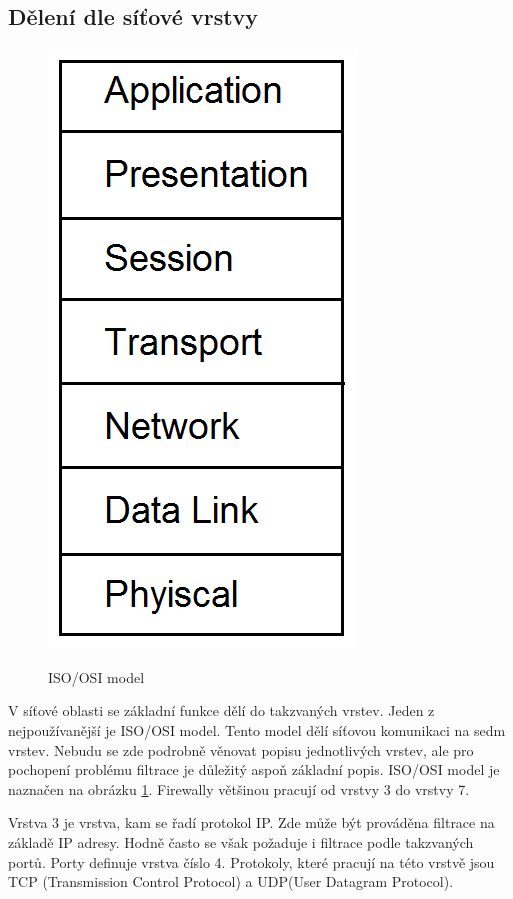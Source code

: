 \documentclass[11pt,twoside,a4paper]{article}
\begin{document}
\subsection{Dělení dle síťové vrstvy}

\begin{figure}
	\center
	\includegraphics[scale=0.25]{./pict/osi.png}
	\label{pic:osi_model}
	\caption{ISO/OSI model \cite{ref:osi}}
\end{figure}

V síťové oblasti se základní funkce dělí do takzvaných vrstev. Jeden z nejpoužívanější je ISO/OSI model. Tento model dělí síťovou komunikaci na sedm vrstev. Nebudu se zde podrobně věnovat popisu jednotlivých vrstev, ale pro pochopení problému filtrace je důležitý aspoň základní popis. ISO/OSI model je naznačen na obrázku \ref{pic:osi_model}. Firewally většinou pracují od vrstvy 3 do vrstvy 7. 


Vrstva 3 je vrstva, kam se řadí protokol IP. Zde může být prováděna filtrace na základě IP adresy. Hodně často se však požaduje i filtrace podle takzvaných portů. Porty definuje vrstva číslo 4. Protokoly, které pracují na této vrstvě jsou TCP (Transmission Control Protocol) a UDP(User Datagram Protocol). 
\end{document}
